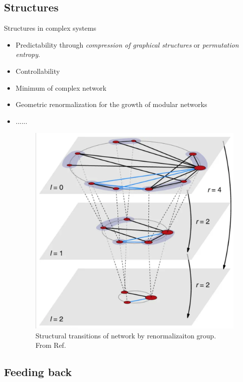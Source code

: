 \subsection{Structures}
\begin{frame}{Structures in complex systems}
\begin{itemize}
    \item Predictability\cite{sun2020revealing,scarpino2019predictability} through \textit{compression of graphical structures} or \textit{permutation entropy}.
    \item Controllability\cite{liu2011controllability,gao2014target,angulo2019theoretical}
    \item Minimum of complex network\cite{barzel2015constructing}
    \item Geometric renormalization for the growth of modular networks\cite{song2006origins}
    \item ......
    \begin{figure}
        \centering
        \includegraphics[width = 0.4\linewidth]{Pics/gr.png}
        \caption{Structural transitions of network by renormalizaiton group. From Ref.\cite{garcia2018multiscale}}
        \label{fig:my_label}
    \end{figure}
\end{itemize}
    
\end{frame}

\subsection{Feeding back}

